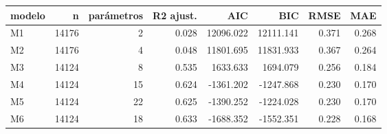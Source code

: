 \begin{tabular}{lrrrrrrr}
\toprule
modelo & n & parámetros & R2 ajust. & AIC & BIC & RMSE & MAE \\
\midrule
M1 & 14176 & 2 & 0.028 & 12096.022 & 12111.141 & 0.371 & 0.268 \\
M2 & 14176 & 4 & 0.048 & 11801.695 & 11831.933 & 0.367 & 0.264 \\
M3 & 14124 & 8 & 0.535 & 1633.633 & 1694.079 & 0.256 & 0.184 \\
M4 & 14124 & 15 & 0.624 & -1361.202 & -1247.868 & 0.230 & 0.170 \\
M5 & 14124 & 22 & 0.625 & -1390.252 & -1224.028 & 0.230 & 0.170 \\
M6 & 14124 & 18 & 0.633 & -1688.352 & -1552.351 & 0.228 & 0.168 \\
\bottomrule
\end{tabular}
